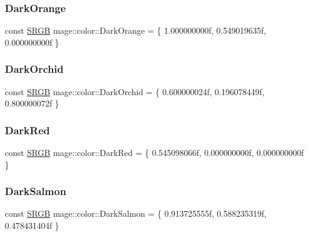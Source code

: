 \subsubsection{\texorpdfstring{Dark\+Orange}{DarkOrange}}
{\footnotesize\ttfamily const \hyperlink{structmage_1_1_s_r_g_b}{S\+R\+GB} mage\+::color\+::\+Dark\+Orange = \{ 1.\+000000000f, 0.\+549019635f, 0.\+000000000f \}}

\hypertarget{namespacemage_1_1color_aae45221c3b076b9d381514cdc0f46138}{}\label{namespacemage_1_1color_aae45221c3b076b9d381514cdc0f46138} 
\subsubsection{\texorpdfstring{Dark\+Orchid}{DarkOrchid}}
{\footnotesize\ttfamily const \hyperlink{structmage_1_1_s_r_g_b}{S\+R\+GB} mage\+::color\+::\+Dark\+Orchid = \{ 0.\+600000024f, 0.\+196078449f, 0.\+800000072f \}}

\hypertarget{namespacemage_1_1color_abaa09a362eaca9de1c1cb2da6fa13f8a}{}\label{namespacemage_1_1color_abaa09a362eaca9de1c1cb2da6fa13f8a} 
\subsubsection{\texorpdfstring{Dark\+Red}{DarkRed}}
{\footnotesize\ttfamily const \hyperlink{structmage_1_1_s_r_g_b}{S\+R\+GB} mage\+::color\+::\+Dark\+Red = \{ 0.\+545098066f, 0.\+000000000f, 0.\+000000000f \}}

\hypertarget{namespacemage_1_1color_a2697a4326b2aedf336ea6ffff44dafcf}{}\label{namespacemage_1_1color_a2697a4326b2aedf336ea6ffff44dafcf} 
\subsubsection{\texorpdfstring{Dark\+Salmon}{DarkSalmon}}
{\footnotesize\ttfamily const \hyperlink{structmage_1_1_s_r_g_b}{S\+R\+GB} mage\+::color\+::\+Dark\+Salmon = \{ 0.\+913725555f, 0.\+588235319f, 0.\+478431404f \}}

\hypertarget{namespacemage_1_1color_a76e0071e1f8b94be7e63c606e50f50ce}{}\label{namespacemage_1_1color_a76e0071e1f8b94be7e63c606e50f50ce} 
